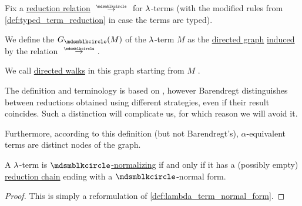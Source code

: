 \begin{definition}\label{def:lambda_term_reduction_graph}\mimprovised
  Fix a \hyperref[def:lambda_term_reduction]{reduction relation} \( {\pred} \) for \( {\mathrm \lambda} \)-terms (with the modified rules from \cref{def:typed_term_reduction} in case the terms are typed).

  We define the  \( G_{\Anon}(M) \) of the \( {\mathrm \lambda} \)-term \( M \) as the \hyperref[def:directed_graph]{directed graph} \hyperref[def:directed_graph_induced_by_relation]{induced} by the relation \( {\pred} \).

  We call \hyperref[def:graph_walk/directed]{directed walks} in this graph starting from \( M \) .
\end{definition}
\begin{comments}
  \item The definition and terminology is based on , however Barendregt distinguishes between reductions obtained using different strategies, even if their result coincides. Such a distinction will complicate us, for which reason we will avoid it.

  Furthermore, according to this definition (but not Barendregt's), \( \alpha \)-equivalent terms are distinct nodes of the graph.
\end{comments}

\begin{proposition}\label{thm:term_normalizing_iff_exists_finite_reduction_chain}
  A \( {\mathrm \lambda} \)-term is \hyperref[def:lambda_term_normal_form]{\( \Anon \)-normalizing} if and only if it has a (possibly empty) \hyperref[def:lambda_term_reduction_graph]{reduction chain} ending with a \( \Anon \)-normal form.
\end{proposition}
\begin{proof}
  This is simply a reformulation of \cref{def:lambda_term_normal_form}.
\end{proof}

